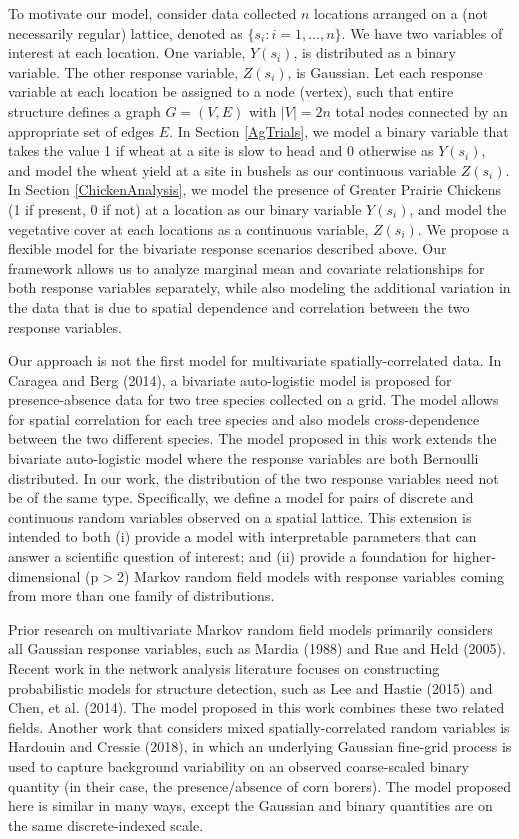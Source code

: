 \documentclass[12pt, a4paper, twoside]{article}
\begin{document}
To motivate our model, consider data collected $n$ locations arranged on a (not necessarily regular) lattice, denoted as $\lbrace s_i: i=1,...,n \rbrace$. We have two variables of interest at each location. One variable, $Y(s_i)$, is distributed as a binary variable. The other response variable, $Z(s_i)$, is Gaussian. Let each response variable at each location be assigned to a node (vertex), such that entire structure defines a graph $G = (V,E)$ with $|V|=2n$ total nodes connected by an appropriate set of edges $E$. In Section \ref{AgTrials}, we model a binary variable that takes the value 1 if wheat at a site is slow to head and 0 otherwise as $Y(s_i)$, and model the wheat yield at a site in bushels as our continuous variable $Z(s_i)$. In Section \ref{ChickenAnalysis}, we model the presence of Greater Prairie Chickens (1 if present, 0 if not) at a location as our binary variable $Y(s_i)$, and model the vegetative cover at each locations as a continuous variable, $Z(s_i)$. We propose a flexible model for the bivariate response scenarios described above. Our framework allows us to analyze marginal mean and covariate relationships for both response variables separately, while also modeling the additional variation in the data that is due to spatial dependence and correlation between the two response variables.

Our approach is not the first model for multivariate spatially-correlated data. In Caragea and Berg (2014), a bivariate auto-logistic model is proposed for presence-absence data for two tree species collected on a grid. The model allows for spatial correlation for each tree species and also models cross-dependence between the two different species. The model proposed in this work extends the bivariate auto-logistic model where the response variables are both Bernoulli distributed. In our work, the distribution of the two response variables need not be of the same type. Specifically, we define a model for pairs of discrete and continuous random variables observed on a spatial lattice. This extension is intended to both (i) provide a model with interpretable parameters that can answer a scientific question of interest; and (ii) provide a foundation for higher-dimensional (p$>$2) Markov random field models with response variables coming from more than one family of distributions.

Prior research on multivariate Markov random field models primarily considers all Gaussian response variables, such as Mardia (1988) and Rue and Held (2005). Recent work in the network analysis literature focuses on constructing probabilistic models for structure detection, such as Lee and Hastie (2015) and Chen, et al. (2014). The model proposed in this work combines these two related fields. Another work that considers mixed spatially-correlated random variables is Hardouin and Cressie (2018), in which an underlying Gaussian fine-grid process is used to capture background variability on an observed coarse-scaled binary quantity (in their case, the presence/absence of corn borers). The model proposed here is similar in many ways, except the Gaussian and binary quantities are on the same discrete-indexed scale.
\end{document}
